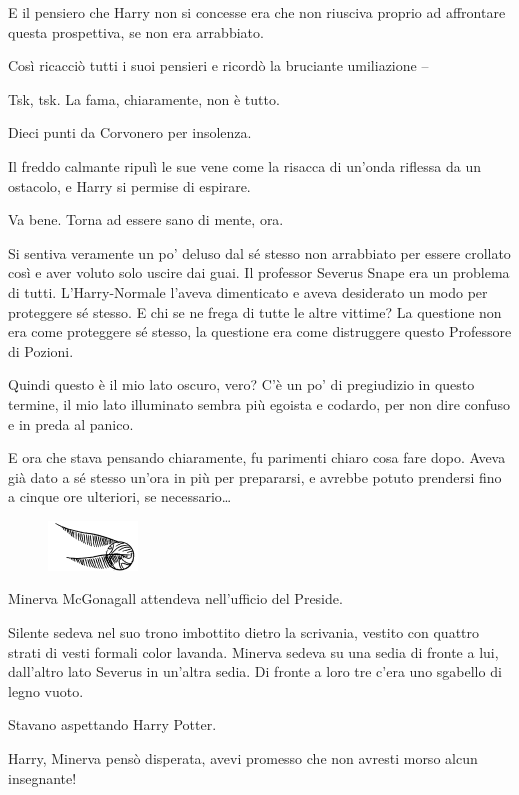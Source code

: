 E il pensiero che Harry non si concesse era che non riusciva proprio ad affrontare questa prospettiva, se non era arrabbiato.

Così ricacciò tutti i suoi pensieri e ricordò la bruciante umiliazione –

Tsk, tsk. La fama, chiaramente, non è tutto.

Dieci punti da Corvonero per insolenza.

Il freddo calmante ripulì le sue vene come la risacca di un’onda riflessa da un ostacolo, e Harry si permise di espirare.

Va bene. Torna ad essere sano di mente, ora.

Si sentiva veramente un po’ deluso dal sé stesso non arrabbiato per essere crollato così e aver voluto solo uscire dai guai. Il professor Severus Snape era un problema di tutti. L’Harry-Normale l’aveva dimenticato e aveva desiderato un modo per proteggere sé stesso. E chi se ne frega di tutte le altre vittime? La questione non era come proteggere sé stesso, la questione era come distruggere questo Professore di Pozioni.

Quindi questo è il mio lato oscuro, vero? C’è un po’ di pregiudizio in questo termine, il mio lato illuminato sembra più egoista e codardo, per non dire confuso e in preda al panico.

E ora che stava pensando chiaramente, fu parimenti chiaro cosa fare dopo. Aveva già dato a sé stesso un’ora in più per prepararsi, e avrebbe potuto prendersi fino a cinque ore ulteriori, se necessario…

\begin{figure}[h!]
        \includegraphics[scale=0.4]{boccino.png}
        \centering
\end{figure}

Minerva McGonagall attendeva nell’ufficio del Preside.

Silente sedeva nel suo trono imbottito dietro la scrivania, vestito con quattro strati di vesti formali color lavanda. Minerva sedeva su una sedia di fronte a lui, dall’altro lato Severus in un’altra sedia. Di fronte a loro tre c’era uno sgabello di legno vuoto.

Stavano aspettando Harry Potter.

Harry, Minerva pensò disperata, avevi promesso che non avresti morso alcun insegnante!

